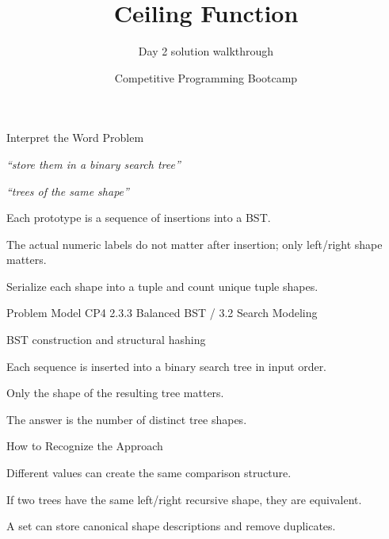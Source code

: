 \documentclass[aspectratio=169,11pt]{beamer}
\title[ceiling]{Ceiling Function}
\subtitle{Day 2 solution walkthrough}
\author[Solution Deck]{Competitive Programming Bootcamp}
\date{}
\begin{document}
\begin{frame}[plain]
  \titlepage
\end{frame}

\begin{frame}{Interpret the Word Problem}
\small
{}
\begin{tightitemize}
  \item \textit{``store them in a binary search tree''}
  \item \textit{``trees of the same shape''}
\end{tightitemize}

\vspace{0.18cm}
\begin{tightitemize}
  \item Each prototype is a sequence of insertions into a BST.
  \item The actual numeric labels do not matter after insertion; only left/right shape matters.
  \item Serialize each shape into a tuple and count unique tuple shapes.
\end{tightitemize}
\end{frame}







\begin{frame}{Problem Model}
\small
{} CP4 2.3.3 Balanced BST / 3.2 Search Modeling

\vspace{0.25cm}
 BST construction and structural hashing

\vspace{0.25cm}
\begin{tightitemize}
  \item Each sequence is inserted into a binary search tree in input order.
  \item Only the shape of the resulting tree matters.
  \item The answer is the number of distinct tree shapes.
\end{tightitemize}
\end{frame}

\begin{frame}{How to Recognize the Approach}
\begin{tightitemize}
  \item Different values can create the same comparison structure.
  \item If two trees have the same left/right recursive shape, they are equivalent.
  \item A set can store canonical shape descriptions and remove duplicates.
\end{tightitemize}
\end{frame}
\end{document}
